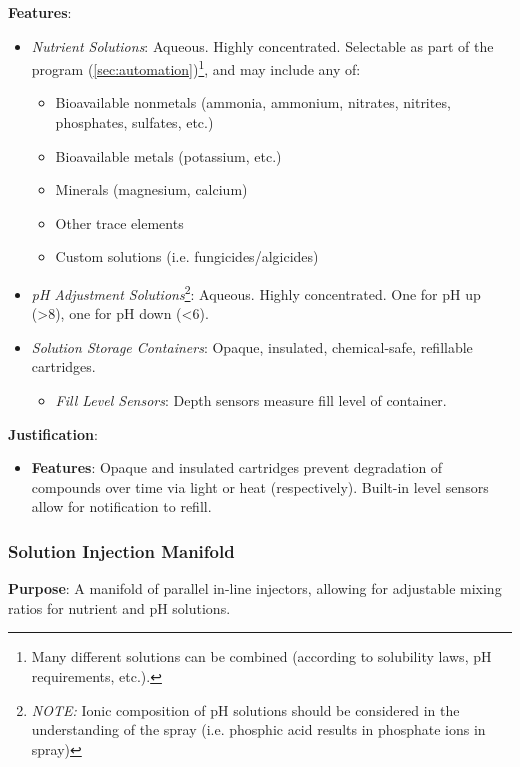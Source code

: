 \documentclass{report}
\begin{document}
\textbf{Features}:
\begin{itemize}
    \item \textit{Nutrient Solutions}: Aqueous. Highly concentrated. Selectable as part of the program (\ref{sec:automation})\footnote{Many different solutions can be combined (according to solubility laws, pH requirements, etc.).}, and may include any of:
    \begin{itemize}
        \item Bioavailable nonmetals (ammonia, ammonium, nitrates, nitrites, phosphates, sulfates, etc.)
        \item Bioavailable metals (potassium, etc.)
        \item Minerals (magnesium, calcium)
        \item Other trace elements
        \item Custom solutions (i.e. fungicides/algicides)
    \end{itemize} 
    \item \textit{pH Adjustment Solutions}\footnote{\textit{NOTE:} Ionic composition of pH solutions should be considered in the understanding of the spray (i.e. phosphic acid results in phosphate ions in spray)}: Aqueous. Highly concentrated. One for pH up (>8), one for pH down (<6).
    \item \textit{Solution Storage Containers}: Opaque, insulated, chemical-safe, refillable cartridges.
    \begin{itemize}
        \item \textit{Fill Level Sensors}: Depth sensors measure fill level of container.
    \end{itemize}
\end{itemize}

\textbf{Justification}: 
\begin{itemize}
    \item \textbf{Features}: Opaque and insulated cartridges prevent degradation of compounds over time via light or heat (respectively). Built-in level sensors allow for notification to refill.
\end{itemize}

\subsubsection{Solution Injection Manifold}
\label{sec:manifold}

\textbf{Purpose}: A manifold of parallel in-line injectors, allowing for adjustable mixing ratios for nutrient and pH solutions.
\end{document}
